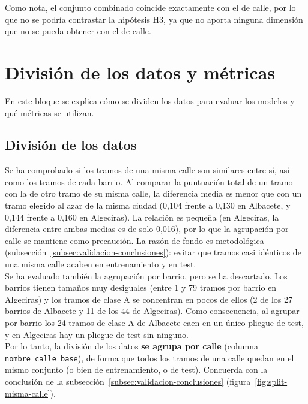 Como nota, el conjunto combinado coincide exactamente con el de calle, por lo que no se podría contrastar la hipótesis H3, ya que no aporta ninguna dimensión que no se pueda obtener con el de calle.
\\


\section{División de los datos y métricas}
\label{sec:dis-division-metricas}

En este bloque se explica cómo se dividen los datos para evaluar los modelos y qué métricas se utilizan.
\\

\subsection{División de los datos}
\label{subsec:dis-division}

Se ha comprobado si los tramos de una misma calle son similares entre sí, así como los tramos de cada barrio. Al comparar la puntuación total de un tramo con la de otro tramo de su misma calle, la diferencia media es menor que con un tramo elegido al azar de la misma ciudad (0,104 frente a 0,130 en Albacete, y 0,144 frente a 0,160 en Algeciras). La relación es pequeña (en Algeciras, la diferencia entre ambas medias es de solo 0,016), por lo que la agrupación por calle se mantiene como precaución. La razón de fondo es metodológica (subsección~\ref{subsec:validacion-conclusiones}): evitar que tramos casi idénticos de una misma calle acaben en entrenamiento y en test.
\\

Se ha evaluado también la agrupación por barrio, pero se ha descartado. Los barrios tienen tamaños muy desiguales (entre 1 y 79 tramos por barrio en Algeciras) y los tramos de clase A se concentran en pocos de ellos (2 de los 27 barrios de Albacete y 11 de los 44 de Algeciras). Como consecuencia, al agrupar por barrio los 24 tramos de clase A de Albacete caen en un único pliegue de test, y en Algeciras hay un pliegue de test sin ninguno.
\\

Por lo tanto, la división de los datos \textbf{se agrupa por calle} (columna \texttt{nombre\_calle\_base}), de forma que todos los tramos de una calle quedan en el mismo conjunto (o bien de entrenamiento, o de test). Concuerda con la conclusión de la subsección~\ref{subsec:validacion-conclusiones} (figura~\ref{fig:split-misma-calle}).
\\

